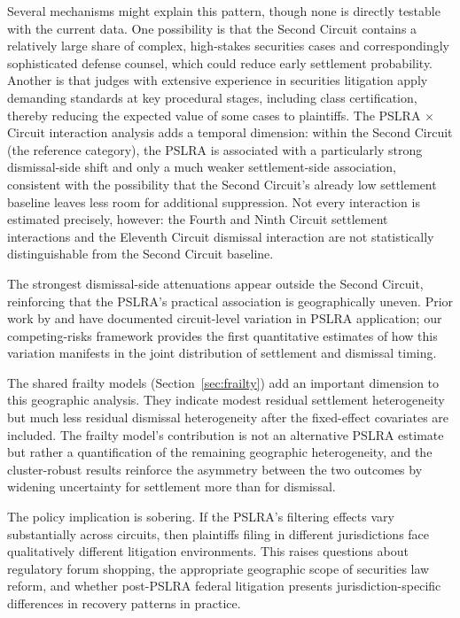 Several mechanisms might explain this pattern, though none is
directly testable with the current data. One possibility is
that the Second Circuit contains a relatively large share of
complex, high-stakes securities cases and correspondingly
sophisticated defense counsel, which could reduce early
settlement probability. Another is that judges with extensive
experience in securities litigation apply demanding standards
at key procedural stages, including class certification,
thereby reducing the expected value of some cases to
plaintiffs. The PSLRA $\times$
Circuit interaction analysis adds a temporal dimension:
within the Second Circuit (the reference category), the PSLRA
is associated with a particularly strong dismissal-side shift
and only a much weaker settlement-side association,
consistent with the possibility that the Second Circuit's
already low settlement baseline leaves less room for
additional suppression. Not every interaction is estimated
precisely, however: the Fourth and Ninth Circuit settlement
interactions and the Eleventh Circuit dismissal interaction
are not statistically distinguishable from the Second
Circuit baseline.

The strongest dismissal-side attenuations appear outside the
Second Circuit, reinforcing that the PSLRA's practical
association is geographically uneven. Prior work by
\citep{johnson2001} and \citep{choi2007} have documented
circuit-level variation in PSLRA application; our
competing-risks framework provides the first quantitative
estimates of how this variation manifests in the joint
distribution of settlement and dismissal timing.

The shared frailty models (Section~\ref{sec:frailty}) add an
important dimension to this geographic analysis. They indicate
modest residual settlement heterogeneity but much less
residual dismissal heterogeneity after the fixed-effect
covariates are included. The frailty model's contribution is
not an alternative PSLRA estimate but rather a quantification
of the remaining geographic heterogeneity, and the
cluster-robust results reinforce the asymmetry between the
two outcomes by widening uncertainty for settlement more than
for dismissal.

The policy implication is sobering. If the PSLRA's
filtering effects vary substantially across circuits, then
plaintiffs filing in different jurisdictions face
qualitatively different litigation environments. This
raises questions about regulatory forum shopping, the
appropriate geographic scope of securities law reform, and
whether post-PSLRA federal litigation presents
jurisdiction-specific differences in recovery patterns in
practice.


